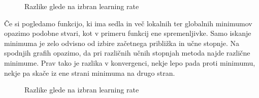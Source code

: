 \documentclass{article}
\begin{document}
\begin{figure}[h]
    \centering
    \caption{Razlike glede na izbran learning rate}
    \label{fig:foobar}
\end{figure}


\noindent Če si pogledamo funkcijo, ki ima sedla in več lokalnih ter globalnih minimumov opazimo podobne stvari, kot v primeru funkcij ene spremenljivke. Samo iskanje minimuma je zelo odvisno od izbire začetnega približka in učne stopnje. Na spodnjih grafih opazimo, da pri različnih učnih stopnjah metoda najde različne minimume. Prav tako je razlika v konvergenci, nekje lepo pada proti minimumu, nekje pa skače iz ene strani minimuma na drugo stran.

\begin{figure}[h]
    \centering
    \caption{Razlike glede na izbran learning rate}
    \label{fig:foobar}
\end{figure}
\end{document}
